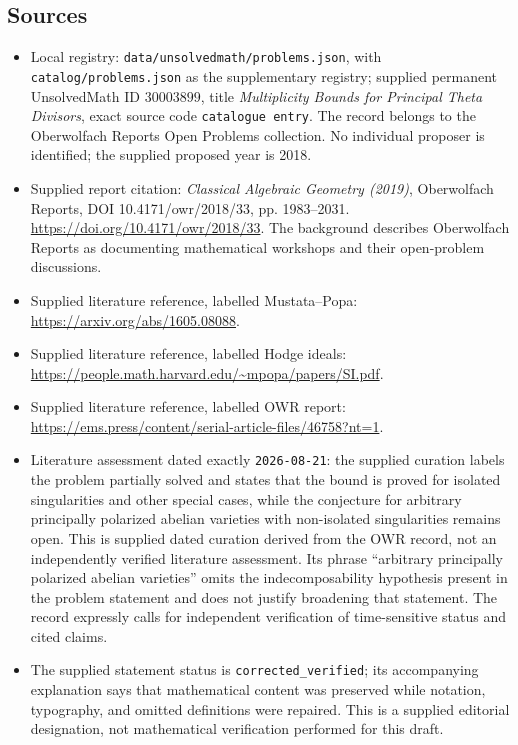 \documentclass[11pt]{article}
\begin{document}
\subsection{Sources}
\begin{itemize}
\item Local registry: \texttt{data/unsolvedmath/problems.json}, with \texttt{catalog/problems.json} as the supplementary registry; supplied permanent UnsolvedMath ID \(30003899\), title \emph{Multiplicity Bounds for Principal Theta Divisors}, exact source code \texttt{catalogue entry}. The record belongs to the Oberwolfach Reports Open Problems collection. No individual proposer is identified; the supplied proposed year is 2018.
\item Supplied report citation: \emph{Classical Algebraic Geometry (2019)}, Oberwolfach Reports, DOI 10.4171/owr/2018/33, pp. 1983--2031. \url{https://doi.org/10.4171/owr/2018/33}. The background describes Oberwolfach Reports as documenting mathematical workshops and their open-problem discussions.
\item Supplied literature reference, labelled Mustata--Popa: \url{https://arxiv.org/abs/1605.08088}.
\item Supplied literature reference, labelled Hodge ideals: \url{https://people.math.harvard.edu/~mpopa/papers/SI.pdf}.
\item Supplied literature reference, labelled OWR report: \url{https://ems.press/content/serial-article-files/46758?nt=1}.
\item Literature assessment dated exactly \texttt{2026-08-21}: the supplied curation labels the problem partially solved and states that the bound is proved for isolated singularities and other special cases, while the conjecture for arbitrary principally polarized abelian varieties with non-isolated singularities remains open. This is supplied dated curation derived from the OWR record, not an independently verified literature assessment. Its phrase ``arbitrary principally polarized abelian varieties'' omits the indecomposability hypothesis present in the problem statement and does not justify broadening that statement. The record expressly calls for independent verification of time-sensitive status and cited claims.
\item The supplied statement status is \texttt{corrected\_verified}; its accompanying explanation says that mathematical content was preserved while notation, typography, and omitted definitions were repaired. This is a supplied editorial designation, not mathematical verification performed for this draft.
\end{itemize}
\end{document}
